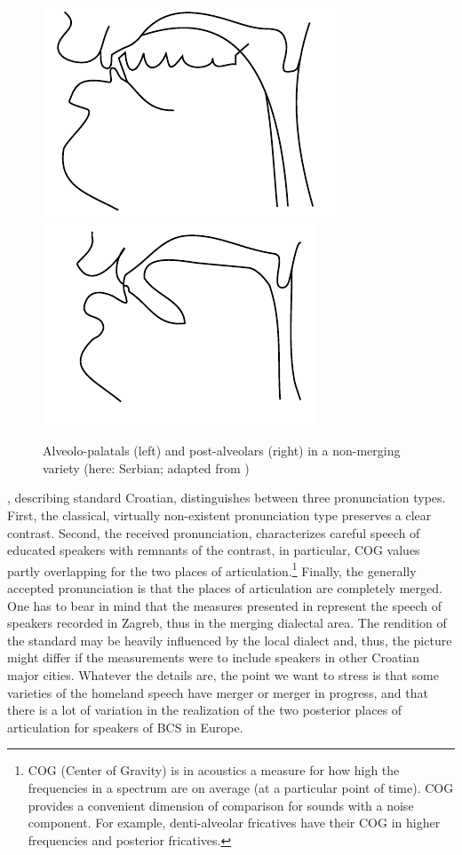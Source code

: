 \documentclass[output=paper,
modfonts,
newtxmath,
hidelinks,
]{langscibook}
\begin{document}
\begin{figure}
\includegraphics[width=.45\textwidth]{figures/MCFigure2left.pdf}
\includegraphics[width=.45\textwidth]{figures/MCFigure2right.pdf}
\caption{\label{fig:mihajlovic:2} Alveolo-palatals (left) and post-alveolars (right) in a non-merging variety (here: Serbian; adapted from \citealt{Miletic1958})}
\end{figure}


\citet{Skaric2009}, %
describing standard Croatian, distinguishes between three pronunciation types. First, the classical, virtually non-existent pronunciation type preserves a clear contrast. Second, the received pronunciation, characterizes careful speech of educated speakers with remnants of the contrast, in particular, COG values partly overlapping for the two places of articulation.\footnote{COG (Center of Gravity) is in acoustics a measure for how high the frequencies in a spectrum are on average (at a particular point of time). COG provides a convenient dimension of comparison for sounds with a noise component. For example, denti-alveolar fricatives have their COG in higher frequencies and posterior fricatives.} Finally, the generally accepted pronunciation is that the places of articulation are completely merged. One has to bear in mind that the measures presented in \citet{Skaric2009} represent the speech of speakers recorded in Zagreb, thus in the merging dialectal area. The rendition of the standard may be heavily influenced by the local dialect and, thus, the picture might differ if the measurements were to include speakers in other Croatian major cities. Whatever the details are, the point we want to stress is that some varieties of the homeland speech have merger or merger in progress, and that there is a lot of variation in the realization of the two posterior places of articulation for speakers of BCS in Europe.
\end{document}
